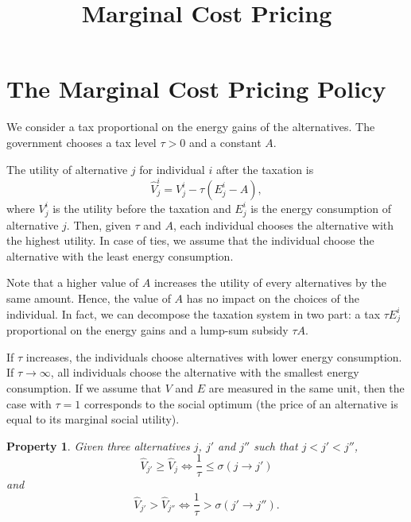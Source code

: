 \documentclass[empty, english]{javaudin}
\title{Marginal Cost Pricing}
\newtheorem{prope}{Property}
\begin{document}
\maketitle

\tableofcontents

\section{The Marginal Cost Pricing Policy}
\label{sec:the_marginal_cost_pricing_policy}

We consider a tax proportional on the energy gains of the alternatives. 
The government chooses a tax level $\tau>0$ and a constant $A$.

The utility of alternative $j$ for individual $i$ after the taxation is
\begin{equation}
	\hat{V}_{j}^i = V_{j}^i - \tau (E_{j}^i - A),
	\label{eq:0}
\end{equation}
where $V_{j}^i$ is the utility before the taxation and $E_{j}^i$ is the energy consumption of alternative $j$. 
Then, given $\tau$ and $A$, each individual chooses the alternative with the highest utility.
In case of ties, we assume that the individual choose the alternative with the least energy consumption.

Note that a higher value of $A$ increases the utility of every alternatives by the same amount.
Hence, the value of $A$ has no impact on the choices of the individual.
In fact, we can decompose the taxation system in two part: a tax $\tau E^i_j$ proportional on the energy gains and a lump-sum subsidy $\tau A$.

If $\tau$ increases, the individuals choose alternatives with lower energy consumption.
If $\tau \rightarrow \infty$, all individuals choose the alternative with the smallest energy consumption.
If we assume that $V$ and $E$ are measured in the same unit, then the case with $\tau = 1$ corresponds to the social optimum (the price of an alternative is equal to its marginal social utility).

\begin{prope}
	Given three alternatives $j$, $j'$ and $j''$ such that $j < j' < j''$,
	\begin{equation}
		\hat{V}_{j'} \geq \hat{V}_{j} \Leftrightarrow \frac{1}{\tau} \leq \sigma(j \rightarrow j')
	\end{equation}
	and
	\begin{equation}
		\hat{V}_{j'} > \hat{V}_{j''} \Leftrightarrow \frac{1}{\tau} > \sigma(j' \rightarrow j'').
	\end{equation}
	\label{prope1}
\end{prope}
\end{document}
